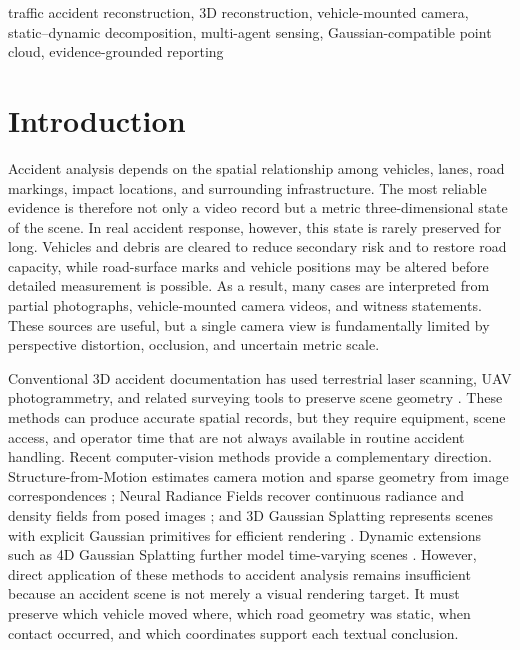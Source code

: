 \documentclass[conference]{IEEEtran}
\begin{document}
\begin{IEEEkeywords}
traffic accident reconstruction, 3D reconstruction, vehicle-mounted camera,
static--dynamic decomposition, multi-agent sensing, Gaussian-compatible point
cloud, evidence-grounded reporting
\end{IEEEkeywords}

\section{Introduction}

Accident analysis depends on the spatial relationship among vehicles, lanes,
road markings, impact locations, and surrounding infrastructure. The most
reliable evidence is therefore not only a video record but a metric
three-dimensional state of the scene. In real accident response, however, this
state is rarely preserved for long. Vehicles and debris are cleared to reduce
secondary risk and to restore road capacity, while road-surface marks and
vehicle positions may be altered before detailed measurement is possible. As a
result, many cases are interpreted from partial photographs, vehicle-mounted
camera videos, and witness statements. These sources are useful, but a single
camera view is fundamentally limited by perspective distortion, occlusion, and
uncertain metric scale.

Conventional 3D accident documentation has used terrestrial laser scanning,
UAV photogrammetry, and related surveying tools to preserve scene geometry
\cite{cappelletti2019forensic,almeshal2020accuracy}. These methods can produce
accurate spatial records, but they require equipment, scene access, and
operator time that are not always available in routine accident handling.
Recent computer-vision methods provide a complementary direction.
Structure-from-Motion estimates camera motion and sparse geometry from image
correspondences \cite{schonberger2016sfm}; Neural Radiance Fields recover
continuous radiance and density fields from posed images \cite{mildenhall2020nerf};
and 3D Gaussian Splatting represents scenes with explicit Gaussian primitives
for efficient rendering \cite{kerbl2023gaussian}. Dynamic extensions such as 4D
Gaussian Splatting further model time-varying scenes \cite{wu2024fourDGS}.
However, direct application of these methods to accident analysis remains
insufficient because an accident scene is not merely a visual rendering target.
It must preserve which vehicle moved where, which road geometry was static,
when contact occurred, and which coordinates support each textual conclusion.
\end{document}
